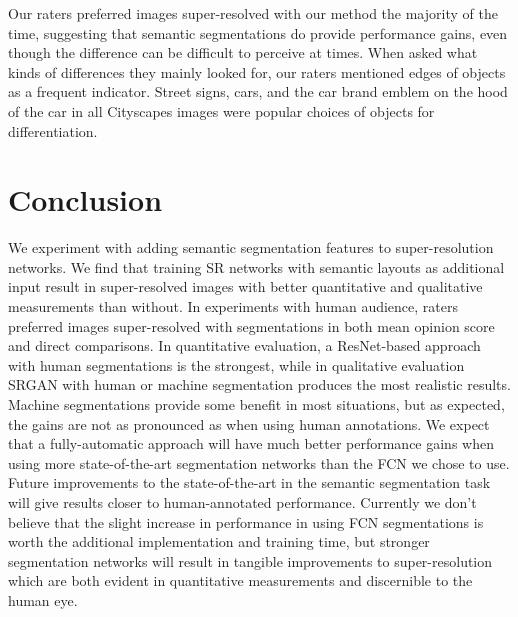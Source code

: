 \documentclass[10pt,twocolumn,letterpaper]{article}
\begin{document}
Our raters preferred images super-resolved with our method the majority of the
time, suggesting that semantic segmentations do provide performance gains, even
though the difference can be difficult to perceive at times. When asked what
kinds of differences they mainly looked for, our raters mentioned edges of
objects as a frequent indicator. Street signs, cars, and the car brand emblem
on the hood of the car in all Cityscapes images were popular choices of objects
for differentiation.


\section{Conclusion}
\label{sec:conclusion}
We experiment with adding semantic segmentation features to super-resolution
networks. We find that training SR networks with semantic layouts as additional
input result in super-resolved images with better quantitative and qualitative
measurements than without. In experiments with human audience, raters preferred
images super-resolved with segmentations in both mean opinion score and direct
comparisons. In quantitative evaluation, a ResNet-based approach with human
segmentations is the strongest, while in qualitative evaluation SRGAN with
human or machine segmentation produces the most realistic results. Machine
segmentations provide some benefit in most situations, but as expected, the
gains are not as pronounced as when using human annotations. We expect that a
fully-automatic approach will have much better performance gains when using
more state-of-the-art segmentation networks than the FCN we chose to use.
Future improvements to the state-of-the-art in the semantic segmentation task
will give results closer to human-annotated performance. Currently we don't
believe that the slight increase in performance in using FCN segmentations is
worth the additional implementation and training time, but stronger
segmentation networks will result in tangible improvements to super-resolution
which are both evident in quantitative measurements and discernible to the
human eye.

\end{document}
